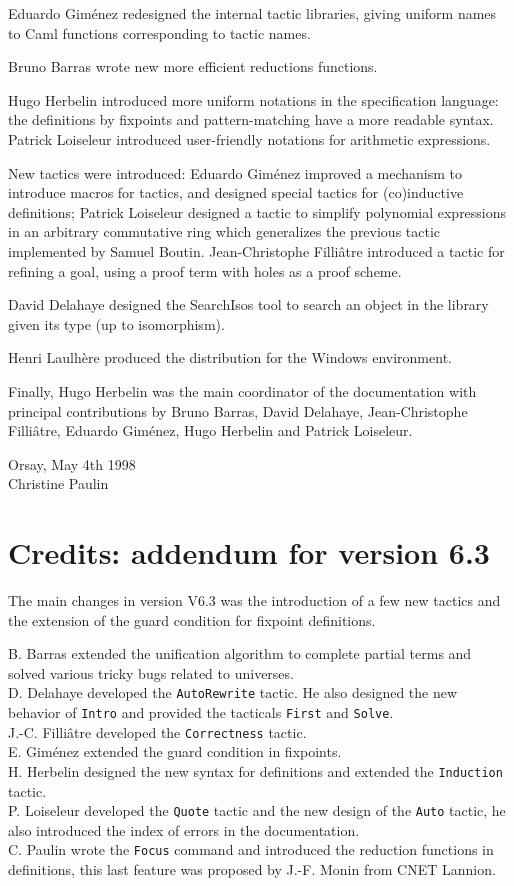 Eduardo Giménez redesigned the internal
tactic libraries, giving uniform names 
to Caml functions corresponding to \Coq{} tactic names. 

Bruno Barras wrote new more efficient reductions functions.

Hugo Herbelin introduced more uniform notations in the \Coq{}
specification language: the definitions by fixpoints and
pattern-matching have a more readable syntax.  Patrick Loiseleur
introduced user-friendly notations for arithmetic expressions.

New tactics were introduced: Eduardo Giménez improved a mechanism to
introduce macros for tactics, and designed special tactics for
(co)inductive definitions; Patrick Loiseleur designed a tactic to
simplify polynomial expressions in an arbitrary commutative ring which
generalizes the previous tactic implemented by Samuel Boutin.
Jean-Christophe Filli\^atre introduced a tactic for refining a goal,
using a proof term with holes as a proof scheme.

David Delahaye designed the \textsf{SearchIsos} tool to search an
object in the library given its type (up to isomorphism).

Henri Laulhère produced the \Coq{} distribution for the Windows environment.

Finally, Hugo Herbelin was the main coordinator of the \Coq{}
documentation with principal contributions by Bruno Barras, David Delahaye, 
Jean-Christophe Filli\^atre, Eduardo
Giménez, Hugo Herbelin and Patrick Loiseleur.

\begin{flushright}
Orsay, May 4th 1998\\
Christine Paulin
\end{flushright}

\section*{Credits: addendum for version 6.3}
The main changes in version V6.3 was the introduction of a few new tactics
and the extension of the guard condition for fixpoint definitions.


B. Barras extended the unification algorithm to complete partial terms
and solved various tricky bugs related to universes.\\
D. Delahaye developed the \texttt{AutoRewrite} tactic. He also designed the new
behavior of \texttt{Intro} and provided the tacticals \texttt{First} and
\texttt{Solve}.\\
J.-C. Filli\^atre developed the \texttt{Correctness} tactic.\\
E. Gim\'enez extended the guard condition in fixpoints.\\
H. Herbelin designed the new syntax for definitions and extended the
\texttt{Induction} tactic.\\
P. Loiseleur developed the \texttt{Quote} tactic and 
the new design of the \texttt{Auto}
tactic, he also introduced the index of
errors in the documentation.\\
C. Paulin wrote the \texttt{Focus} command and introduced 
the reduction functions in definitions, this last feature 
was proposed by J.-F. Monin from CNET Lannion. 

